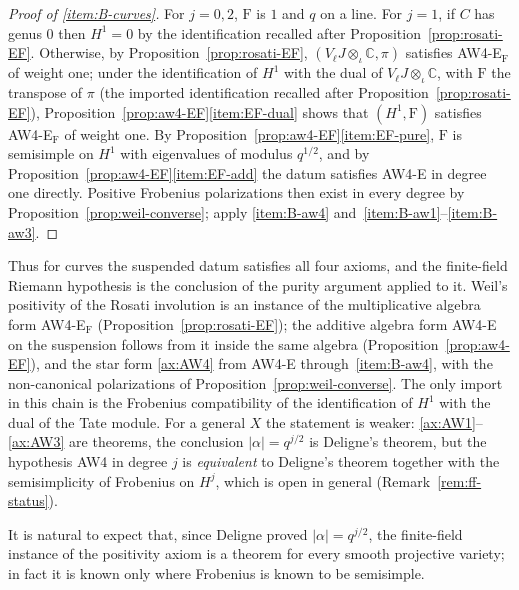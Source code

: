 \documentclass[11pt]{amsart}
\theoremstyle{plain}
\theoremstyle{definition}
\theoremstyle{remark}
\numberwithin{equation}{section}
\newcommand{\C}{\mathbb{C}}
\begin{document}
\begin{proof}[Proof of \ref{item:B-curves}]
For $j=0,2$, $\mathrm{F}$ is $1$ and $q$ on a line. For $j=1$, if $C$
has genus $0$ then $H^1=0$ by the identification recalled after
Proposition~\ref{prop:rosati-EF}. Otherwise, by
Proposition~\ref{prop:rosati-EF}, $(V_\ell J\otimes_\iota\C,\pi)$
satisfies AW4-E$_{\mathrm F}$ of weight one; under the identification
of $H^1$ with the dual of $V_\ell J\otimes_\iota\C$, with
$\mathrm{F}$ the transpose of $\pi$ (the imported identification
recalled after Proposition~\ref{prop:rosati-EF}),
Proposition~\ref{prop:aw4-EF}\ref{item:EF-dual} shows that
$(H^1,\mathrm{F})$ satisfies AW4-E$_{\mathrm F}$ of weight one. By
Proposition~\ref{prop:aw4-EF}\ref{item:EF-pure}, $\mathrm{F}$ is
semisimple on $H^1$ with eigenvalues of modulus $q^{1/2}$, and by
Proposition~\ref{prop:aw4-EF}\ref{item:EF-add} the datum satisfies
AW4-E in degree one directly. Positive Frobenius polarizations then
exist in every degree by Proposition~\ref{prop:weil-converse}; apply
\ref{item:B-aw4} and~\ref{item:B-aw1}--\ref{item:B-aw3}.
\end{proof}

Thus for curves the suspended datum satisfies all four axioms, and the
finite-field Riemann hypothesis is the conclusion of the purity argument
applied to it. Weil's positivity of the Rosati involution is an instance
of the multiplicative algebra form AW4-E$_{\mathrm F}$
(Proposition~\ref{prop:rosati-EF}); the additive algebra form AW4-E on
the suspension follows from it inside the same algebra
(Proposition~\ref{prop:aw4-EF}), and the star form \ref{ax:AW4} from
AW4-E through~\ref{item:B-aw4}, with the non-canonical polarizations of
Proposition~\ref{prop:weil-converse}. The only import in this chain is
the Frobenius compatibility of the identification of $H^1$ with the
dual of the Tate module. For a
general $X$ the statement is weaker: \ref{ax:AW1}--\ref{ax:AW3} are
theorems, the conclusion $|\alpha|=q^{j/2}$ is Deligne's theorem, but
the hypothesis AW4 in degree $j$ is \emph{equivalent} to Deligne's
theorem together with the semisimplicity of Frobenius on $H^j$, which is
open in general (Remark~\ref{rem:ff-status}).

It is natural to expect that, since Deligne proved $|\alpha|=q^{j/2}$,
the finite-field instance of the positivity axiom is a theorem for
every smooth projective variety; in fact it is known only where
Frobenius is known to be semisimple.
\end{document}
